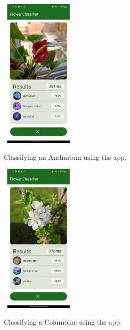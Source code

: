 \documentclass{article}
\begin{document}
\clearpage

\begin{figure}[h]\
    \includegraphics[width=0.3\textwidth]{anthurium.jpg}
    \caption{Classifying an Anthurium using the app.}
    \label{fig:anthurium}
\end{figure}

\begin{figure}[h]\
    \includegraphics[width=0.3\textwidth]{columbine.jpg}
    \caption{Classifying a Columbine using the app.}
    \label{fig:columbine}
\end{figure}
\end{document}
